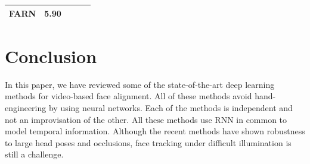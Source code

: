 \documentclass{llncs}
\begin{document}
\begin{table}[]
\begin{tabular}{|l|l|l|l|l|}
FARN\cite{farn}                    & 5.90                                                                   &                                                                       &                                                                        &                                                                       \\ \hline
\end{tabular}
\label{comparison}
\end{table}



\section{Conclusion}

In this paper, we have reviewed some of the state-of-the-art deep learning methods for video-based face alignment. All of these methods avoid hand-engineering by using neural networks. Each of the methods is independent and not an improvisation of the other. All these methods use RNN in common to model temporal information. Although the recent methods have shown robustness to large head poses and occlusions, face tracking under difficult illumination is still a challenge.

%

%
%


%
\end{document}
